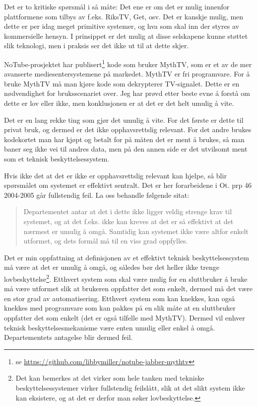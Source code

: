 \documentclass[11pt,norsk,a4paper]{article}
\begin{document}
Det er to kritiske spørsmål i så måte: Det ene er om det er mulig
innenfor plattformene som tilbys av f.eks. RiksTV, Get, osv. Det er
kanskje mulig, men dette er per idag meget primitive systemer, og hva
som skal inn der styres av kommersielle hensyn. I prinsippet er det
mulig at disse selskapene kunne støttet slik teknologi, men i praksis
ser det ikke ut til at dette skjer.

NoTube-prosjektet har
publisert\footnote{se \url{https://github.com/libbymiller/notube-jabber-mythtv}}
kode som bruker MythTV, som er et av de mer avanserte
mediesentersystemene på markedet. MythTV er fri programvare. For å
bruke MythTV må man kjøre kode som dekrypterer TV-signalet. Dette er
en nødvendighet for bruksscenariet over. Jeg har prøvd etter beste
evne å forstå om dette er lov eller ikke, men konklusjonen er at det
er det helt umulig å vite. 

Det er en lang rekke ting som gjør det umulig å vite. For det første
er dette til privat bruk, og dermed er det ikke opphavsrettslig
relevant. For det andre brukes kodekortet man har kjøpt og betalt for
på måten det er ment å brukes, så man baner seg ikke vei til andres
data, men på den annen side er det utvilsomt ment som et teknisk
beskyttelsessystem.

Hvis ikke det at det er ikke er opphavsrettslig relevant kan hjelpe,
så blir spørsmålet om systemet er effektivt sentralt. Det er her
forarbeidene i Ot. prp 46 2004-2005 går fullstendig feil. La oss
behandle følgende sitat:

\begin{quote}
Departementet antar at det i dette ikke ligger veldig strenge krav til
systemet, og at det f.eks. ikke kan kreves at det er så effektivt at
det nærmest er umulig å omgå. Samtidig kan systemet ikke være altfor
enkelt utformet, og dets formål må til en viss grad oppfylles. 
\end{quote}

Det er min oppfattning at definisjonen av et effektivt teknisk
beskyttelsessystem må være at det er umulig å omgå, og således bør det
heller ikke trenge lovbeskyttelse\footnote{Det kan bemerkes at det
virker som hele tanken med tekniske beskyttelsessystemer virker
fullstendig feilslått, slik at det slikt system ikke kan eksistere, og
at det er derfor man søker lovbeskyttelse.}. Etthvert system som skal
være mulig for en sluttbruker å bruke må være utformet slik at
brukeren oppfatter det som enkelt, dermed må det være en stor grad av
automatisering. Etthvert system som kan knekkes, kan også knekkes med
programvare som kan pakkes på en slik måte at en sluttbruker oppfatter
det som enkelt (det er også tilfelle med MythTV). Dermed vil enhver
teknisk beskyttelsesmekanisme være enten umulig eller enkel å
omgå. Departementets antagelse blir dermed feil. 
\end{document}
